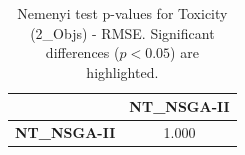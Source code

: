 \begin{table}[h!]
\centering
\scriptsize
\begin{tabular}{lc}
\toprule
 & NT\_NSGA-II \\
\midrule
\textbf{NT\_NSGA-II} & 1.000 \\
\bottomrule
\end{tabular}
\caption{Nemenyi test p-values for Toxicity (2_Objs) - RMSE. Significant differences ($p < 0.05$) are highlighted.}
\label{tab:nemenyi_nemenyi_Toxicity_2_Objs_Test_RMSE}
\end{table}